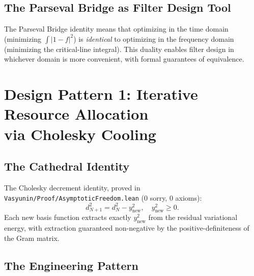 \documentclass[11pt,a4paper]{article}
\begin{document}
\subsection{The Parseval Bridge as Filter Design Tool}

The Parseval Bridge identity means that optimizing in the time
domain (minimizing $\int|1-f|^2$) is \emph{identical} to optimizing
in the frequency domain (minimizing the critical-line integral).
This duality enables filter design in whichever domain is more
convenient, with formal guarantees of equivalence.

\section{Design Pattern 1: Iterative Resource Allocation\\
  via Cholesky Cooling}
\label{sec:cholesky}

\subsection{The Cathedral Identity}

The Cholesky decrement identity, proved in
\texttt{Vasyunin/Proof/AsymptoticFreedom.lean}
(0 sorry, 0 axioms):
\begin{equation}\label{eq:cholesky}
  d^2_{N+1} = d^2_N - y_{\text{new}}^2,
  \quad y_{\text{new}}^2 \geq 0.
\end{equation}
Each new basis function extracts exactly $y_{\text{new}}^2$ from the
residual variational energy, with extraction guaranteed non-negative
by the positive-definiteness of the Gram matrix.

\subsection{The Engineering Pattern}
\end{document}
